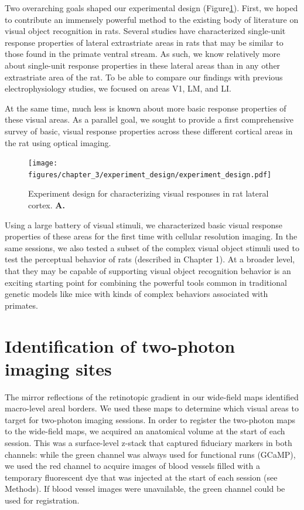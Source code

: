 Two overarching goals shaped our experimental design (Figure\ref{fig:experiment_design}). First, we hoped to contribute an immensely powerful method to the existing body of literature on visual object recognition in rats. Several studies have characterized single-unit response properties of lateral extrastriate areas in rats that may be similar to those found in the primate ventral stream\cite{Tafazoli2017, Vermaercke2014, VinkenX, Vermaerke2015}. As such, we know relatively more about single-unit response properties in these lateral areas than in any other extrastriate area of the rat\cite{Vermaercke2014, Tafazoli2017, Vinken2016, REFREF}. To be able to compare our findings with previous electrophysiology studies, we focused on areas V1, LM, and LI. 

At the same time, much less is known about more basic response properties of these visual areas. As a parallel goal, we sought to provide a first comprehensive survey of basic, visual response properties across these different cortical areas in the rat using optical imaging. 

\begin{figure}
    \texttt{[image: figures/chapter\_3/experiment\_design/experiment\_design.pdf]}
    \vspace{.1in}
    \caption[Experiment design]{Experiment design for characterizing visual responses in rat lateral cortex. \textbf{A.} 
    \label{fig:experiment_design}}
\end{figure}

Using a large battery of visual stimuli, we characterized basic visual response properties of these areas for the first time with cellular resolution imaging. In the same sessions, we also tested a subset of the complex visual object stimuli used to test the perceptual behavior of rats (described in Chapter 1). At a broader level, that they may be capable of supporting visual object recognition behavior is an exciting starting point for combining the powerful tools common in traditional genetic models like mice with kinds of complex behaviors associated with primates.  

\section{Identification of two-photon imaging sites}
The mirror reflections of the retinotopic gradient in our wide-field maps identified macro-level areal borders. We used these maps to determine which visual areas to target for two-photon imaging sessions. In order to register the two-photon maps to the wide-field maps, we acquired an anatomical volume at the start of each session. This was a surface-level z-stack that captured fiduciary markers in both channels: while the green channel was always used for functional runs (GCaMP), we used the red channel to acquire images of blood vessels filled with a temporary fluorescent dye that was injected at the start of each session (see Methods). If blood vessel images were unavailable, the green channel could be used for registration. 

